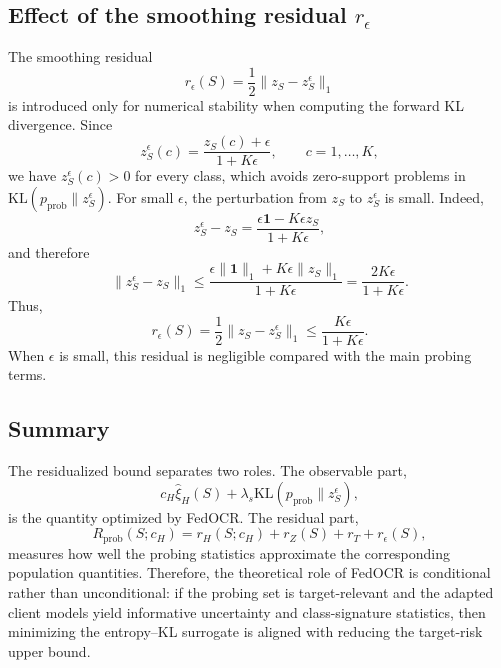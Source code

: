 \subsection{Effect of the smoothing residual $r_\epsilon$}
\label{app:smoothing_residual}

The smoothing residual
\[
r_\epsilon(S)
=
\frac12\|z_S-z_S^\epsilon\|_1
\]
is introduced only for numerical stability when computing the forward KL divergence.
Since
\[
z_S^\epsilon(c)
=
\frac{z_S(c)+\epsilon}{1+K\epsilon},
\qquad c=1,\dots,K,
\]
we have $z_S^\epsilon(c)>0$ for every class, which avoids zero-support problems in $\mathrm{KL}(p_{\mathrm{prob}}\|z_S^\epsilon)$.
For small $\epsilon$, the perturbation from $z_S$ to $z_S^\epsilon$ is small.
Indeed,
\[
z_S^\epsilon-z_S
=
\frac{\epsilon\mathbf 1-K\epsilon z_S}{1+K\epsilon},
\]
and therefore
\[
\|z_S^\epsilon-z_S\|_1
\le
\frac{\epsilon\|\mathbf 1\|_1+K\epsilon\|z_S\|_1}{1+K\epsilon}
=
\frac{2K\epsilon}{1+K\epsilon}.
\]
Thus,
\[
r_\epsilon(S)
=
\frac12\|z_S-z_S^\epsilon\|_1
\le
\frac{K\epsilon}{1+K\epsilon}.
\]
When $\epsilon$ is small, this residual is negligible compared with the main probing terms.

\subsection{Summary}
\label{app:probing_consistency_summary}

The residualized bound separates two roles.
The observable part,
\[
c_H\widehat{\xi}_{H}(S)
+
\lambda_s\mathrm{KL}(p_{\mathrm{prob}}\|z_S^\epsilon),
\]
is the quantity optimized by FedOCR.
The residual part,
\[
R_{\mathrm{prob}}(S;c_H)
=
r_H(S;c_H)+r_Z(S)+r_T+r_\epsilon(S),
\]
measures how well the probing statistics approximate the corresponding population quantities.
Therefore, the theoretical role of FedOCR is conditional rather than unconditional: if the probing set is target-relevant and the adapted client models yield informative uncertainty and class-signature statistics, then minimizing the entropy--KL surrogate is aligned with reducing the target-risk upper bound.

